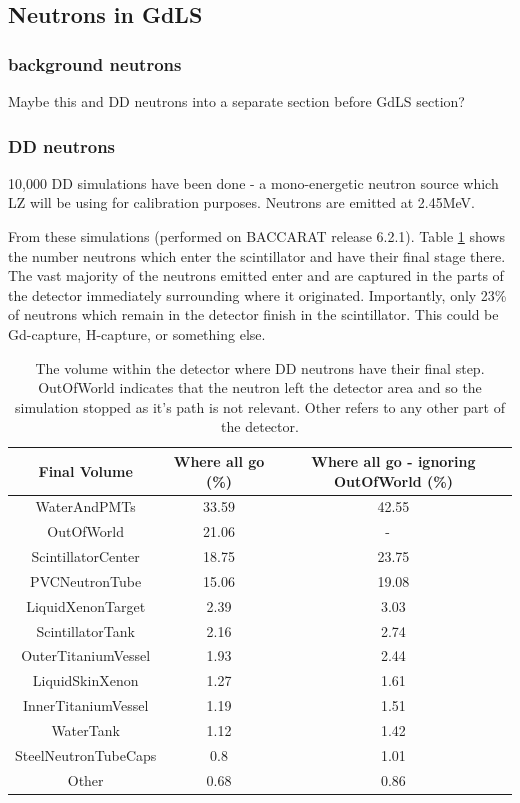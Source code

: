 \subsection{Neutrons in GdLS}

\subsubsection{background neutrons}
\par
Maybe this and DD neutrons into a separate section before GdLS section?

\subsubsection{DD neutrons}
\par
10,000 DD simulations have been done - a mono-energetic neutron source which LZ will be using for calibration purposes.
Neutrons are emitted at 2.45MeV.

\par
From these simulations (performed on BACCARAT release 6.2.1).
Table \ref{tab:Where_neutrons_go} shows the number neutrons which enter the scintillator and have their final stage there.
The vast majority of the neutrons emitted enter and are captured in the parts of the detector immediately surrounding where it originated.
Importantly, only 23\% of neutrons which remain in the detector finish in the scintillator.
This could be Gd-capture, H-capture, or something else.

\begin{table}[!htbp]
    \centering
    \begin{tabular}{c | c | c  }
    \hline
    {Final Volume}  & {Where all go (\%)} & {Where all go - ignoring OutOfWorld (\%)} \\ \hline
    WaterAndPMTs & 33.59 & 42.55 \\
    OutOfWorld & 21.06 & - \ \\
    ScintillatorCenter & 18.75 & 23.75 \\
    PVCNeutronTube & 15.06 & 19.08 \\
    LiquidXenonTarget & 2.39 & 3.03 \\
    ScintillatorTank & 2.16 & 2.74 \\
    OuterTitaniumVessel & 1.93 & 2.44 \\
    LiquidSkinXenon & 1.27 & 1.61 \\
    InnerTitaniumVessel & 1.19 & 1.51 \\
    WaterTank & 1.12 & 1.42 \\
    SteelNeutronTubeCaps & 0.8 & 1.01 \\
    Other & 0.68 & 0.86 
    \end{tabular}
    \caption{The volume within the detector where DD neutrons have their final step. OutOfWorld indicates that the neutron left the detector area and so the simulation stopped as it's path is not relevant. Other refers to any other part of the detector.}
    \label{tab:Where_neutrons_go}
\end{table} 

